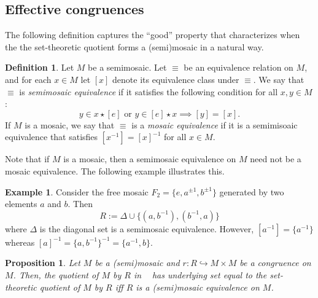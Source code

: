 \documentclass[reqno]{amsart}
\newcommand{\cat}[1]{\ensuremath{\mathsf{#1}}}
\DeclareMathOperator{\sMsc}{\cat{(S)Msc}}
\numberwithin{equation}{section}
\theoremstyle{plain}
\newtheorem{proposition}[equation]{Proposition}
\theoremstyle{definition}
\newtheorem{definition}[equation]{Definition}
\newtheorem{example}[equation]{Example}
\begin{document}
\subsection{Effective congruences}

The following definition captures the ``good'' property that characterizes when the the set-theoretic quotient forms a (semi)mosaic in a natural way.



\begin{definition}\label{def:mosaic congruences}
Let $M$ be a semimosaic. Let $\equiv$ be an equivalence relation on $M$, and for each $x \in M$ let $[x]$ denote its equivalence class under $\equiv$. We say that $\equiv$ is \emph{semimosaic equivalence} if it satisfies the following condition for all $x,y \in M$:
\[
y \in x \star [e] \mbox{ or }y \in [e] \star x \implies [y] = [x].
\]
If $M$ is a mosaic, we say that $\equiv$ is a \emph{mosaic equivalence} if it is a semimisoaic equivalence that satisfies $[x^{-1}]=[x]^{-1}$ for all $x \in M$.
\end{definition}


Note that if $M$ is a mosaic, then a semimosaic equivalence on $M$ need not be a mosaic equivalence. The following example illustrates this.

\begin{example}
    Consider the free mosaic $F_2=\{e, a^{\pm 1}, b^{\pm 1}\}$ generated by two elements $a$ and $b$. Then 
$$R:=\Delta\cup\{(a, b^{-1}), (b^{-1}, a)\}$$
 where $\Delta$ is the diagonal set is a semimosaic equivalence. However, $[a^{-1}]=\{a^{-1}\}$ whereas $[a]^{-1}=\{a, b^{-1}\}^{-1}=\{a^{-1}, b\}$.
\end{example}

\begin{proposition}\label{prop:congruences}
Let $M$ be a (semi)mosaic and $r:R\hookrightarrow M\times M$ be a congruence on $M$. Then, the quotient of $M$ by $R$ in $\sMsc$ has underlying set equal to the set-theoretic quotient of $M$ by $R$ iff $R$ is a (semi)mosaic equivalence on $M$.
\end{proposition}
\end{document}
